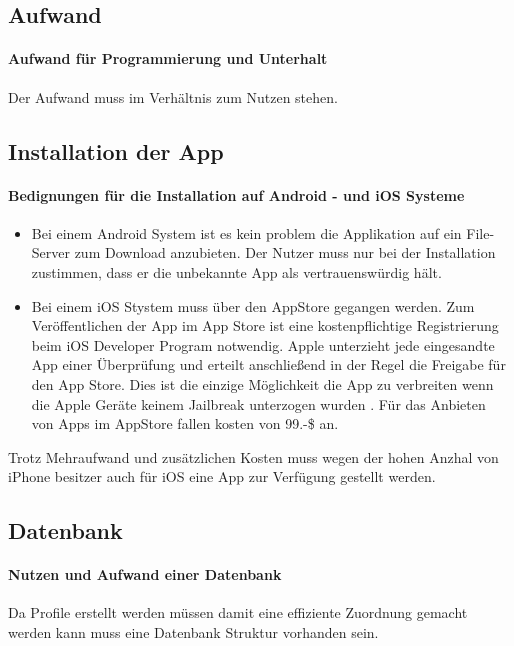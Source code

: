\subsection{Aufwand}
\paragraph{Aufwand für Programmierung und Unterhalt} Der Aufwand muss im Verhältnis zum Nutzen stehen. 

\subsection{Installation der App}
\paragraph{Bedignungen für die Installation auf Android - und iOS Systeme}
\begin{itemize}
\item Bei einem Android System ist es kein problem die Applikation auf ein File-Server zum Download anzubieten. Der Nutzer muss nur bei der Installation zustimmen, dass er die unbekannte App als vertrauenswürdig hält.
\item Bei einem iOS Stystem muss über den AppStore gegangen werden.  Zum Veröffentlichen der App im App Store ist eine kostenpflichtige Registrierung beim iOS Developer Program notwendig. Apple unterzieht jede eingesandte App einer Überprüfung und erteilt anschließend in der Regel die Freigabe für den App Store. Dies ist die einzige Möglichkeit die App zu verbreiten wenn die Apple Geräte keinem Jailbreak unterzogen wurden \cite{appStore}. Für das Anbieten von Apps im AppStore fallen kosten von 99.-\$ an.
\end{itemize}
Trotz Mehraufwand und zusätzlichen Kosten muss wegen der hohen Anzhal von iPhone besitzer auch für iOS eine App zur Verfügung gestellt werden.

\subsection{Datenbank}
\paragraph{Nutzen und Aufwand einer Datenbank}Da Profile erstellt werden müssen damit eine effiziente Zuordnung gemacht werden kann muss eine Datenbank Struktur vorhanden sein.

